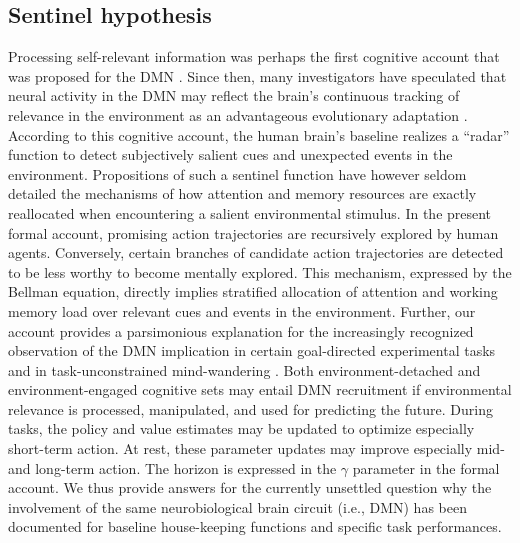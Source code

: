 \documentclass[10pt,letterpaper]{article}
\begin{document}
\subsection{Sentinel hypothesis}
Processing self-relevant information was perhaps the first
cognitive account that was proposed for the DMN \citep{gusnard2001medial}.
Since then,
many investigators have speculated that neural activity in the DMN
may reflect the brain's continuous tracking of
relevance in the environment
as an advantageous evolutionary adaptation \citep{randy2008, hahn2007cingulate}.
According to this cognitive account, the human brain's baseline realizes
a ``radar'' function to
detect subjectively salient cues and unexpected events in the environment.
Propositions of such a sentinel function have however seldom detailed
the mechanisms of
how attention and memory resources are exactly reallocated when
encountering a salient environmental stimulus.
In the present formal account,
promising action trajectories
are recursively explored by human agents. Conversely,
certain branches of candidate action trajectories
are detected to be less worthy to become mentally explored.
This mechanism, expressed by the Bellman equation,
directly implies stratified allocation of attention and working memory load
over relevant cues and events in the environment.
%
Further,
our account provides a parsimonious explanation for
the increasingly recognized observation
of the DMN implication
in certain goal-directed experimental tasks and
in task-unconstrained mind-wandering \citep{smith2009, bzdok2016formal}.
Both environment-detached and environment-engaged
cognitive sets may entail DMN recruitment
if environmental relevance is processed, manipulated, and
used for predicting the future.
During tasks,
the policy and value estimates may be
updated to optimize especially short-term action.
At rest, these parameter updates may
improve especially mid- and long-term action.
The horizon is expressed in the $\gamma$ parameter in the formal account.
We thus provide answers for the currently unsettled question why the involvement
of the same neurobiological brain circuit (i.e., DMN) has been documented
for baseline house-keeping functions and specific task performances.
\end{document}
